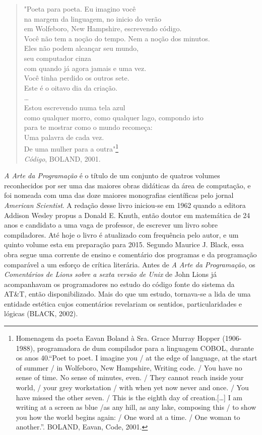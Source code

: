 {\footnotesize
\begin{verse}
\begin{flushright}
"Poeta para poeta. Eu imagino você\\
na margem da linguagem, no inicio do verão\\
em Wolfeboro, New Hampshire, escrevendo código.\\
Você não tem a noção do tempo. Nem a noção dos minutos.\\
Eles não podem alcançar seu mundo,\\
seu computador cinza\\
com quando já agora jamais e uma vez.\\
Você tinha perdido os outros sete.\\
Este é o oitavo dia da criação.\\
\ldots \\
Estou escrevendo numa tela azul\\
como qualquer morro, como qualquer lago, compondo isto\\
para te mostrar como o mundo recomeça:\\
Uma palavra de cada vez.\\
De uma mulher para a outra"\footnote{Homenagem da poeta Eavan Boland à Sra. Grace Murray Hopper (1906-1988), programadora de dum compilador para a linguagem COBOL, durante os anos 40.“Poet to poet. I imagine you / at the edge of language, at the start of summer / in Wolfeboro, New Hampshire, Writing code. / You have no sense of time. No sense of minutes, even. / They cannot reach inside your world, / your grey workstation / with when yet now never and once. / You have missed the other seven. / This is the eighth day of creation.[…] I am writing at a screen as blue /as any hill, as any lake, composing this / to show you how the world begins again: / One word at a time. / One woman to another.”. BOLAND, Eavan, Code, 2001.} \\
\emph{Código}, BOLAND, 2001.
\end{flushright}
\end{verse}
}

\emph{A Arte da Programação} é o título de um conjunto de quatros volumes reconhecidos por ser uma das maiores obras didáticas da área de computação, e foi nomeada com uma das doze maiores monografias científicas pelo jornal \emph{American Scientist}. A redação desse livro iniciou-se em 1962 quando a editora Addison Wesley propus a Donald E. Knuth, então doutor em matemática de 24 anos e candidato a uma vaga de professor, de escrever um livro sobre compiladores. Até hoje o livro é atualizado com frequência pelo autor, e um quinto volume esta em preparação para 2015. Segundo Maurice J. Black, essa obra segue uma corrente de ensino e comentário dos programas e da programação comparável a um esforço de crítica literária. Antes de \emph{A Arte da Programação}, os \emph{Comentários de Lions sobre a sexta versão de Unix} de John Lions já acompanhavam os programadores no estudo do código fonte do sistema da AT\&T, então disponibilizado. Mais do que um estudo, tornava-se a lida de uma entidade estética cujos comentários revelariam os sentidos, particularidades e lógicas (BLACK, 2002). 

